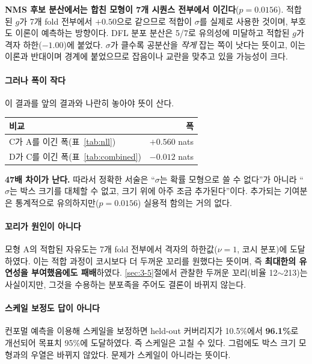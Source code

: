 \documentclass[12pt,a4paper,oneside]{report}
\begin{document}
\textbf{NMS 후보 분산에서는 합친 모형이 7개 시퀀스 전부에서 이긴다}($p = 0.0156$). 적합된 $g$가 7개 fold 전부에서 $+0.50$으로 같으므로 적합이 $\sigma$를 실제로 사용한 것이며, 부호도 이론이 예측하는 방향이다. DFL 분포 분산은 5/7로 유의성에 미달하고 적합된 $g$가 격자 하한($-1.00$)에 붙었다. $\sigma$가 클수록 공분산을 \textit{작게} 잡는 쪽이 낫다는 뜻이고, 이는 이론과 반대이며 경계에 붙었으므로 잡음이나 교란을 맞추고 있을 가능성이 크다.

\paragraph{그러나 폭이 작다} 이 결과를 앞의 결과와 나란히 놓아야 뜻이 산다.

\begin{center}
\begin{tabular}{lr}
\toprule
\textbf{비교} & 폭 \\
\midrule
C가 A를 이긴 폭(표~\ref{tab:nll}) & $+0.560$ nats \\
D가 C를 이긴 폭(표~\ref{tab:combined}) & $-0.012$ nats \\
\bottomrule
\end{tabular}
\end{center}

\textbf{47배 차이가 난다.} 따라서 정확한 서술은 ``$\sigma$는 확률 모형으로 쓸 수 없다''가 아니라 ``$\sigma$는 박스 크기를 대체할 수 없고, 크기 위에 아주 조금 추가된다''이다. 추가되는 기여분은 통계적으로 유의하지만($p = 0.0156$) 실용적 함의는 거의 없다.

\paragraph{꼬리가 원인이 아니다} 모형 A의 적합된 자유도는 7개 fold 전부에서 격자의 하한값($\nu = 1$, 코시 분포)에 도달하였다. 이는 적합 과정이 코시보다 더 두꺼운 꼬리를 원했다는 뜻이며, 즉 \textbf{최대한의 유연성을 부여했음에도 패배}하였다. \ref{sec:3-5}절에서 관찰한 두꺼운 꼬리(비율 12$\sim$213)는 사실이지만, 그것을 수용하는 분포족을 주어도 결론이 바뀌지 않는다.

\paragraph{스케일 보정도 답이 아니다} 컨포멀 예측을 이용해 스케일을 보정하면 held-out 커버리지가 10.5\%에서 \textbf{96.1\%}로 개선되어 목표치 95\%에 도달하였다. 즉 스케일은 고칠 수 있다. 그럼에도 박스 크기 모형과의 우열은 바뀌지 않았다. 문제가 스케일이 아니라는 뜻이다.
\end{document}

